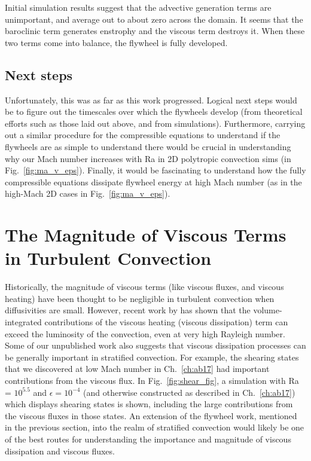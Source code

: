 Initial simulation results suggest that the advective generation terms are unimportant, and average out to about zero across the domain.
It seems that the baroclinic term generates enstrophy and the viscous term destroys it.
When these two terms come into balance, the flywheel is fully developed.

\subsection{Next steps}
Unfortunately, this was as far as this work progressed.
Logical next steps would be to figure out the timescales over which the flywheels develop (from theoretical efforts such as those laid out above, and from simulations).
Furthermore, carrying out a similar procedure for the compressible equations to understand if the flywheels are as simple to understand there would be crucial in understanding why our Mach number increases with Ra in 2D polytropic convection sims (in Fig.~\ref{fig:ma_v_eps}).
Finally, it would be fascinating to understand how the fully compressible equations dissipate flywheel energy at high Mach number (as in the high-Mach 2D cases in Fig.~\ref{fig:ma_v_eps}).

\section{The Magnitude of Viscous Terms in Turbulent Convection}
Historically, the magnitude of viscous terms (like viscous fluxes, and viscous heating) have been thought to be negligible in turbulent convection when diffusivities are small.
However, recent work by \citet{currie&all2017} has shown that the volume-integrated contributions of the viscous heating (viscous dissipation) term can exceed the luminosity of the convection, even at very high Rayleigh number.
Some of our unpublished work also suggests that viscous dissipation processes can be generally important in stratified convection.
For example, the shearing states that we discovered at low Mach number in Ch.~\ref{ch:ab17} had important contributions from the viscous flux.
In Fig.~\ref{fig:shear_fig}, a simulation with Ra = $10^{5.5}$ and $\epsilon = 10^{-4}$ (and otherwise constructed as described in Ch.~\ref{ch:ab17}) which displays shearing states is shown, including the large contributions from the viscous fluxes in those states.
An extension of the flywheel work, mentioned in the previous section, into the realm of stratified convection would likely be one of the best routes for understanding the importance and magnitude of viscous dissipation and viscous fluxes.

